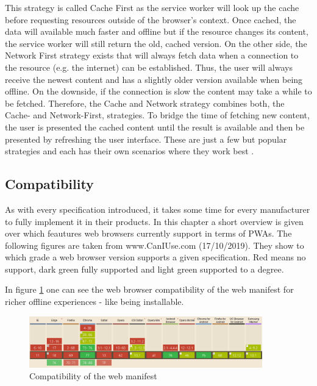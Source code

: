 This strategy is called Cache First as the service worker will look up the cache before requesting resources outside of the browser’s context. Once cached, the data will available much faster and offline but if the resource changes its content, the service worker will still return the old, cached version. On the other side, the Network First strategy exists that will always fetch data when a connection to the resource (e.g. the internet) can be established. Thus, the user will always receive the newest content and has a slightly older version available when being offline. On the downside, if the connection is slow the content may take a while to be fetched. Therefore, the Cache and Network strategy combines both, the Cache- and Network-First, strategies. To bridge the time of fetching new content, the user is presented the cached content until the result is available and then be presented by refreshing the user interface. These are just a few but popular strategies and each has their own scenarios where they work best \cite[pp. 109-111]{hajianProgressiveWebApps2019}.

\subsection{Compatibility}
\label{sec:theorieCd}


As with every specification introduced, it takes some time for every manufacturer to fully implement it in their products. In this chapter a short overview is given over which feautures web browsers currently support in terms of  \acs{PWA}s. The following figures are taken from www.CanIUse.com (17/10/2019). They show to which grade a web browser version supports a given specification. Red means no support, dark green fully supported and light green supported to a degree.

In figure \ref{fig:pwacompatibilitywebmanifest} one can see the web browser compatibility of the web manifest for richer offline experiences - like being installable.

\begin{figure}[htbp] 
	\centering
	\includegraphics[width=0.9\textwidth]{Assets/chapter_pwa/webmanifestsupport.PNG}
	\caption{Compatibility of the web manifest}
	\label{fig:pwacompatibilitywebmanifest}
\end{figure}


